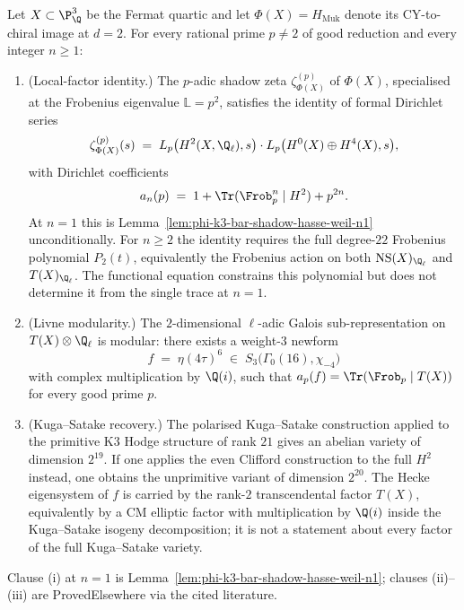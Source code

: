 \begin{proposition}
\label{prop:phi-k3-padic-langlands-fermat}
Let $X \subset \P^3_\Q$ be the Fermat quartic and let $\Phi(X) = H_{\mathrm{Muk}}$ denote its CY-to-chiral image at $d = 2$. For every rational prime $p \neq 2$ of good reduction and every integer $n \geq 1$:

\begin{enumerate}[label=\textup{(\roman*)}]
 \item \textup{(Local-factor identity.)} The $p$-adic shadow zeta $\zeta^{(p)}_{\Phi(X)}$ of $\Phi(X)$, specialised at the Frobenius eigenvalue $\mathbb{L} = p^2$, satisfies the identity of formal Dirichlet series
 \[
 \zeta^{(p)}_{\Phi(X)}(s) \;=\; L_p\bigl(H^2(X, \Q_\ell), s\bigr) \cdot L_p\bigl(H^0(X) \oplus H^4(X), s\bigr),
 \]
 with Dirichlet coefficients
 \[
 a_n(p) \;=\; 1 + \Tr(\Frob_p^n \mid H^2) + p^{2 n}.
 \]
 At $n = 1$ this is Lemma~\ref{lem:phi-k3-bar-shadow-hasse-weil-n1} unconditionally. For $n \geq 2$ the identity requires the full degree-$22$ Frobenius polynomial $P_2(t)$, equivalently the Frobenius action on both $\mathrm{NS}(X)_{\Q_\ell}$ and $T(X)_{\Q_\ell}$. The functional equation constrains this polynomial but does not determine it from the single trace at $n=1$.

 \item \textup{(Livne modularity.)} The $2$-dimensional $\ell$-adic Galois sub-representation on $T(X) \otimes \Q_\ell$ is modular: there exists a weight-$3$ newform
 \[
 f \;=\; \eta(4\tau)^6 \;\in\; S_3\bigl(\Gamma_0(16), \chi_{-4}\bigr)
 \]
 with complex multiplication by $\Q(i)$, such that $a_p(f) = \Tr(\Frob_p \mid T(X))$ for every good prime $p$.

 \item \textup{(Kuga--Satake recovery.)} The polarised Kuga--Satake construction applied to the primitive K3 Hodge structure of rank $21$ gives an abelian variety of dimension $2^{19}$. If one applies the even Clifford construction to the full $H^2$ instead, one obtains the unprimitive variant of dimension $2^{20}$. The Hecke eigensystem of $f$ is carried by the rank-$2$ transcendental factor $T(X)$, equivalently by a CM elliptic factor with multiplication by $\Q(i)$ inside the Kuga--Satake isogeny decomposition; it is not a statement about every factor of the full Kuga--Satake variety.
\end{enumerate}

Clause (i) at $n = 1$ is Lemma~\ref{lem:phi-k3-bar-shadow-hasse-weil-n1}; clauses (ii)--(iii) are ProvedElsewhere via the cited literature.
\end{proposition}

